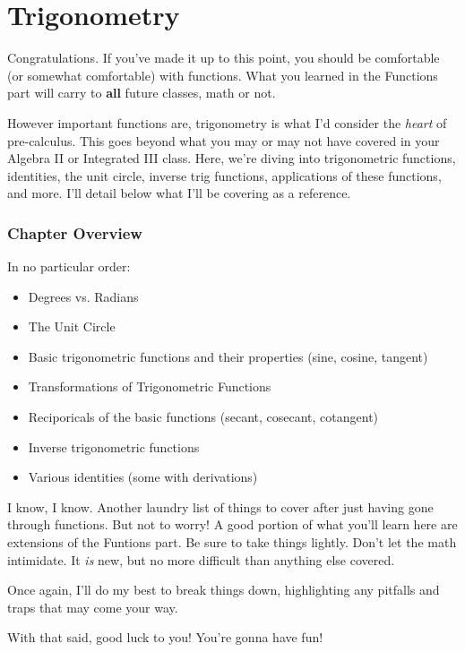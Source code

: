 \clearpage
\part{Trigonometry}
Congratulations. If you've made it up to this point, you should be comfortable (or somewhat comfortable) with functions. What you learned in the Functions part will carry to \textbf{all} future classes, math or not.

However important functions are, trigonometry is what I'd consider the \textit{heart} of pre-calculus. This goes beyond what you may or may not have covered in your Algebra II or Integrated III class. Here, we're diving into trigonometric functions, identities, the unit circle, inverse trig functions, applications of these functions, and more. I'll detail below what I'll be covering as a reference.
\section*{Chapter Overview}
In no particular order:
\begin{itemize}
    \item Degrees vs. Radians 
    \item The Unit Circle
    \item Basic trigonometric functions and their properties (sine, cosine, tangent)
    \item Transformations of Trigonometric Functions
    \item Reciporicals of the basic functions (secant, cosecant, cotangent)
    \item Inverse trigonometric functions
    \item Various identities (some with derivations)
\end{itemize}
I know, I know. Another laundry list of things to cover after just having gone through functions. But not to worry! A good portion of what you'll learn here are extensions of the Funtions part. Be sure to take things lightly. Don't let the math intimidate. It \textit{is} new, but no more difficult than anything else covered.

Once again, I'll do my best to break things down, highlighting any pitfalls and traps that may come your way.

With that said, good luck to you! You're gonna have fun!